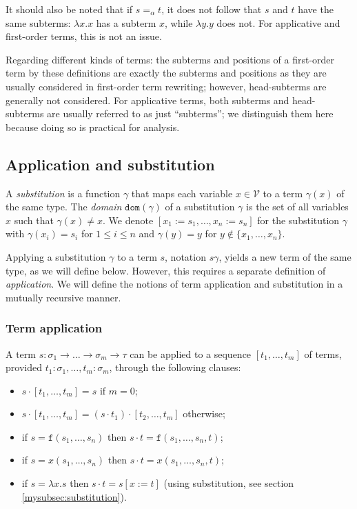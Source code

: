 \documentclass{lmcs}
\theoremstyle{theorem}\newtheorem{theorem}{Theorem}
\theoremstyle{theorem}\newtheorem{lemma}[theorem]{Lemma}
\theoremstyle{theorem}\newtheorem{corollary}[theorem]{Corollary}
\theoremstyle{definition}\newtheorem{definition}[theorem]{Definition}
\theoremstyle{definition}\newtheorem{example}[theorem]{Example}
\newcommand{\V}{\mathcal{V}}
\newcommand{\domain}{\mathtt{dom}}
\newcommand{\atype}{\sigma}
\newcommand{\btype}{\tau}
\newcommand{\identifier}[1]{\mathtt{#1}}
\newcommand{\afun}{\identifier{f}}
\newcommand{\avar}{x}
\newcommand{\abs}[2]{\lambda #1.#2}
\newcommand{\arrtype}{\rightarrow}
\newcommand{\mysubsection}[1]{\vspace{-12pt}\subsubsection{#1}}
\begin{document}
It should also be noted that if $s =_\alpha t$, it does not follow that $s$ and $t$ have the same
subterms: $\abs{x}{x}$ has a subterm $x$, while $\abs{y}{y}$ does not.  For applicative and
first-order terms, this is not an issue.

Regarding different kinds of terms: the subterms and positions of a first-order term by these
definitions are exactly the subterms and positions as they are usually considered in first-order
term rewriting; however, head-subterms are generally not considered.  For applicative terms,
both subterms and head-subterms are usually referred to as just ``subterms''; we distinguish them
here because doing so is practical for analysis.

\subsection{Application and substitution}

A \emph{substitution} is a function $\gamma$ that maps each variable $\avar \in \V$ to a term
$\gamma(\avar)$ of the same type.
The \emph{domain} $\domain(\gamma)$ of a substitution $\gamma$ is the set of all variables $x$
such that $\gamma(x) \neq x$.
We denote $[x_1:=s_1,\dots,x_n:=s_n]$ for the substitution $\gamma$ with $\gamma(x_i) = s_i$ for
$1 \leq i \leq n$ and $\gamma(y) = y$ for $y \notin \{x_1,\dots,x_n\}$.

Applying a substitution $\gamma$ to a term $s$, notation $s\gamma$, yields a new term of the same
type, as we will define below. However, this requires a separate definition of \emph{application}.
We will define the notions of term application and substitution in a mutually recursive manner.

\mysubsection{Term application}\label{mysubsec:application}
A term $s : \atype_1 \arrtype \dots \arrtype \atype_m \arrtype \btype$ can be applied to a sequence
$[t_1,\dots,t_m]$ of terms, provided $t_1 : \atype_1,\dots,t_m : \atype_m$, through the following
clauses:
\begin{itemize}
\item $s \cdot [t_1,\dots,t_m] = s$ if $m = 0$;
\item $s \cdot [t_1,\dots,t_m] = (s \cdot t_1) \cdot [t_2,\dots,t_m]$ otherwise;
\item if $s = \afun(s_1,\dots,s_n)$ then $s \cdot t = \afun(s_1,\dots,s_n,t)$;
\item if $s = \avar(s_1,\dots,s_n)$ then $s \cdot t = \avar(s_1,\dots,s_n,t)$;
\item if $s = \abs{\avar}{s}$ then $s \cdot t = s[\avar:=t]$ (using substitution, 
  see section \ref{mysubsec:substitution}).
\end{itemize}
\end{document}
